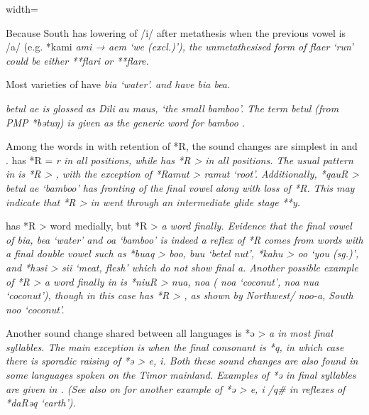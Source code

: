 \begin{table}[p]
\begin{adjustbox}{width=\textwidth}
\begin{threeparttable}
\begin{tablenotes}
{								Because South  has lowering of /i/ after metathesis when
								the previous vowel is /a/ (e.g.
								*kami \it{ami → aem} ‘we (excl.)’),
								the unmetathesised form of \it{flaer} ‘run’ could be either **flari or **flare.}
			\item[Δ]	{Most varieties of  have \it{bia} ‘water’.
								 and   have \it{bia {\tl} bea}.}
			\item[{ǁ}]	{ \it{betul ae} is glossed as  Dili \it{au
								maus},  ‘the small bamboo’.
								The term \it{betul} (from PMP *bətuŋ) is given as the generic
								word for bamboo \citep[4]{LSG2006}.}
		\end{tablenotes}
	\end{threeparttable}
\end{adjustbox}
\end{table}

Among the words in  with retention of *R,
the sound changes are simplest in  and .
 has *R = \it{r} in all positions,
while  has *R > {\0} in all positions.
The usual pattern in  is *R > {\0},
with the exception of *Ramut > \it{ramut} ‘root’.
Additionally, *qauR > \it{betul ae} `bamboo' has fronting
of the final vowel along with loss of *R.
This may indicate that *R > {\0} in  went through an
intermediate glide stage **y.

 has *R > {\0} word medially,
but *R > \it{a} word finally.
Evidence that the final vowel of  \it{bia,
bea} ‘water’ and \it{oa} ‘bamboo’ is indeed a reflex of *R comes
from words with a final double vowel such as *buaq > \it{boo,
buu} ‘betel nut’, *kahu > \it{oo} ‘you (sg.)’,
and *həsi > \it{sii} ‘meat,
flesh’ which do not show final \it{a}.
Another possible example of *R > \it{a} word finally in 
is *niuR > \it{nua,
noa} (  \it{noa} ‘coconut’,
  \it{noa {\tl} nua} ‘coconut’),
though in this case  has *R > {\0},
as shown by Northwest/  \it{noo-a},
South  \it{noo} ‘coconut’.

Another sound change shared between all  languages
is *ə > \it{a} in most final syllables.
The main exception is when the final consonant is *q,
in which case there is sporadic raising of *ə > \it{e, i}.
Both these sound changes are also found in some 
languages spoken on the Timor mainland.
Examples of *ə in final syllables are given in . (See
also  on  for another example of *ə > \it{e,
i} /{\gap}q{\#} in reflexes of *daRəq ‘earth’).


